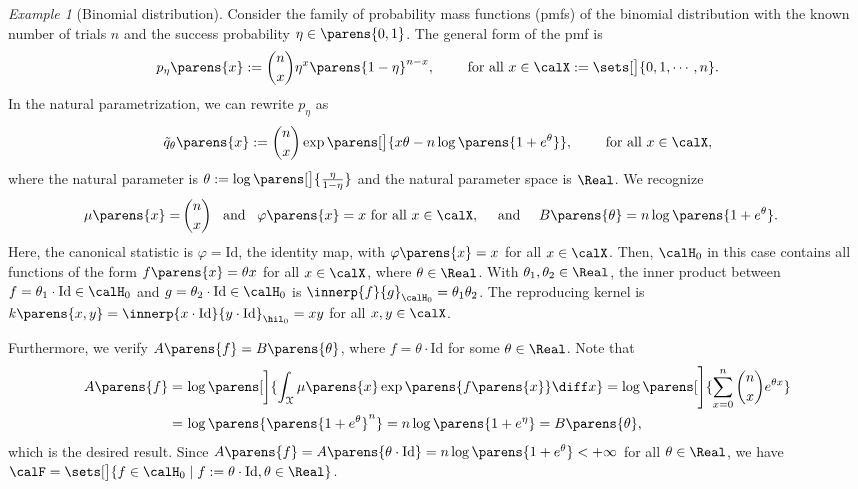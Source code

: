 \documentclass[12pt]{article}
\theoremstyle{definition}
\theoremstyle{theorem}
\theoremstyle{remark}
\newtheorem{example}{Example}
\begin{document}
\begin{example}[Binomial distribution]
	Consider the family of probability mass functions (pmfs) of the binomial distribution with the known number of trials $n$ and the success probability $\eta \in \parens{0, 1}$. The general form of the pmf is 
	\begin{align*}
		p_{\eta} \parens{x} := {n \choose x} \eta^x \parens{1 - \eta}^{n-x}, \qquad \text{ for all } x \in \calX := \sets[\big]{0, 1, \cdots, n}. 
	\end{align*}		
	In the natural parametrization, we can rewrite $p_{\eta}$ as 
	\begin{align*}
		\tilde{q}_{\theta} \parens{x} := {n \choose x} \exp \parens[\big]{x \theta - n \log \parens{1 + e^\theta}}, \qquad \text{ for all } x \in \calX, 
	\end{align*}
	where the natural parameter is $\theta := \log \parens[\big]{\frac{\eta}{1-\eta}}$ and the natural parameter space is $\Real$. We recognize 
	\begin{align*}
		\mu \parens{x} = & \, {n \choose x} \enspace \text{ and } \enspace \varphi \parens{x} = x \text{ for all } x \in \calX, \quad \text{ and } \quad 
		B \parens{\theta} = n \log \parens{1 + e^\theta}. 
	\end{align*}
	Here, the canonical statistic is $\varphi = \mathrm{Id}$, the identity map, with $\varphi \parens{x} = x$ for all $x \in \calX$. Then, $\calH_0$ in this case contains all functions of the form $f \parens{x} = \theta x$ for all $x \in \calX$, where $\theta \in \Real$. With $\theta_1, \theta_2 \in \Real$, the inner product between $f = \theta_1 \cdot \mathrm{Id} \in \calH_0$ and $g = \theta_2 \cdot \mathrm{Id} \in \calH_0$ is $\innerp{f}{g}_{\calH_0} = \theta_1 \theta_2$. The reproducing kernel is $k \parens{x, y} = \innerp{x \cdot \mathrm{Id}}{y \cdot \mathrm{Id} }_{\hil_0} = x y$ for all $x, y \in \calX$. 
	
	Furthermore, we verify $A \parens{f} = B \parens{\theta}$, where $f = \theta \cdot \mathrm{Id}$ for some $\theta \in \Real$. Note that 
	\begin{align*}
		A \parens{f} = & \, \log \parens[\bigg]{\int_{\mathcal{X}} \mu \parens{x} \exp \parens{f \parens{x} } \diff x} 
		= \log \parens[\Bigg]{\sum_{x=0}^n {n \choose x} e^{\theta x}}  \\ 
		= & \, \log \parens{\parens{1+e^{\theta}}^n} 
		= n \log \parens{1+e^{\eta}} = B \parens{\theta}, 
	\end{align*}
	which is the desired result. Since $A \parens{f} = A \parens{\theta \cdot \mathrm{Id} } = n \log \parens{1 + e^{\theta}} < + \infty$ for all $\theta \in \Real$, we have $\calF = \sets[\big]{f \in \calH_0 \mid f := \theta \cdot \mathrm{Id}, \theta \in \Real}$. 
\end{example}
\end{document}
